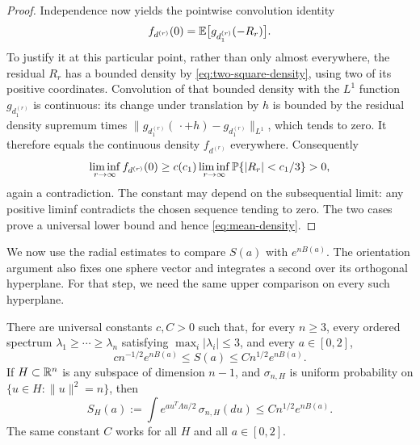 \begin{proof}
Independence now yields the pointwise convolution identity
\[
 f_{d^{(r)}}(0)=\mathbb E\bigl[g_{d_1^{(r)}}(-R_r)\bigr].
\]
To justify it at this particular point, rather than only almost
everywhere, the residual $R_r$ has a bounded density by
\eqref{eq:two-square-density}, using two of its positive coordinates.
Convolution of that bounded density with the $L^1$ function
$g_{d_1^{(r)}}$ is continuous: its change under translation by $h$
is bounded by the residual density supremum times
$\|g_{d_1^{(r)}}(\,\cdot+h)-g_{d_1^{(r)}}\|_{L^1}$, which tends to zero.
It therefore equals the continuous density $f_{d^{(r)}}$ everywhere.
Consequently
\[
 \liminf_{r\to\infty}f_{d^{(r)}}(0)
 \ge c(c_1)\liminf_{r\to\infty}\mathbb P\{|R_r|<c_1/3\}>0,
\]
again a contradiction.  The constant may depend on the subsequential
limit: any positive liminf contradicts the chosen sequence tending
to zero.  The two cases prove a universal lower bound and hence
\eqref{eq:mean-density}.
\end{proof}

We now use the radial estimates to compare $S(a)$ with $e^{nB(a)}$.
The orientation argument also fixes one sphere vector and integrates
a second over its orthogonal hyperplane. For that step, we need the same
upper comparison on every such hyperplane.

\begin{lemma}
\label{lem:partition-bounds}
There are universal constants $c,C>0$ such that, for every $n\ge3$,
every ordered spectrum $\lambda_1\ge\cdots\ge\lambda_n$ satisfying
$\max_i|\lambda_i|\le3$, and every $a\in[0,2]$,
\[
 c n^{-1/2}e^{nB(a)}
 \le S(a)\le C n^{1/2}e^{nB(a)}.
\]
If $H\subset\mathbb R^n$ is any subspace of dimension $n-1$, and
$\sigma_{n,H}$ is uniform probability on
$\{u\in H:\|u\|^2=n\}$, then
\[
 S_H(a):=\int e^{a u^T\Lambda u/2}\,\sigma_{n,H}(du)
 \le C n^{1/2}e^{nB(a)}.
\]
The same constant $C$ works for all $H$ and all $a\in[0,2]$.
\end{lemma}

